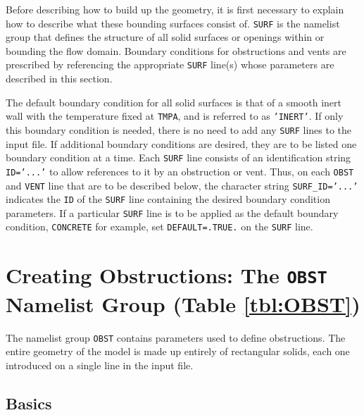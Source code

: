 \documentclass[11pt]{book}
\newcommand{\ct}{\tt\small}
\begin{document}
Before describing how to build up the geometry, it is first necessary to explain how to describe what these bounding surfaces
consist of. {\ct SURF} is the namelist group that defines
the structure of all solid surfaces or openings within or
bounding the flow domain. Boundary conditions for obstructions and vents are
prescribed by referencing the appropriate {\ct SURF} line(s) whose
parameters are described in this section.

The default boundary condition for all solid surfaces is that of a smooth
inert wall with the temperature fixed at {\ct TMPA}, and is referred to as {\ct 'INERT'}. If only this
boundary condition is needed, there is no need to add any {\ct SURF} lines
to the input file. If additional boundary conditions are desired,
they are to be listed one boundary condition at a time.
Each {\ct SURF} line consists of an identification string {\ct ID='...'} to
allow references to it by an obstruction or vent. Thus, on each
{\ct OBST} and {\ct VENT} line that are to be described below, the character string {\ct SURF\_ID='...'}
indicates the {\ct ID} of the {\ct SURF} line containing the desired boundary
condition parameters. If a particular {\ct SURF} line is to be applied
as the default boundary condition, {\ct CONCRETE} for example,
set {\ct DEFAULT=.TRUE.} on the {\ct SURF} line.




\section{Creating Obstructions: The \texorpdfstring{{\tt OBST}}{OBST} Namelist Group (Table \ref{tbl:OBST})}
\label{info:OBST}

The namelist group {\ct OBST} contains parameters used to define obstructions. The entire geometry of the model is made up entirely
of rectangular solids, each one introduced on a single line in the input file.

\subsection{Basics}
\label{info:OBST_Basics}
\end{document}
